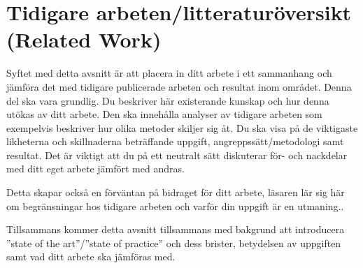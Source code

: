 \section{Tidigare arbeten/litteraturöversikt (Related Work)}

Syftet med detta avsnitt är att placera in ditt arbete i ett sammanhang och jämföra det med tidigare publicerade arbeten och resultat inom området. Denna del ska vara grundlig. Du beskriver här existerande kunskap och hur denna utökas av ditt arbete. Den ska innehålla analyser av tidigare arbeten som exempelvis beskriver hur olika metoder skiljer sig åt. Du ska visa på de viktigaste likheterna och skillnaderna beträffande uppgift, angreppssätt/metodologi samt resultat. Det är viktigt att du på ett neutralt sätt diskuterar för- och nackdelar med ditt eget arbete jämfört med andras.

Detta skapar också en förväntan på bidraget för ditt arbete, läsaren lär sig här om begränsningar hos tidigare arbeten och varför din uppgift är en utmaning.. 

Tillsammans kommer detta avsnitt tillsammans med bakgrund att introducera ”state of the art”/”state of practice” och dess brister, betydelsen av uppgiften samt vad ditt arbete ska jämföras med.
